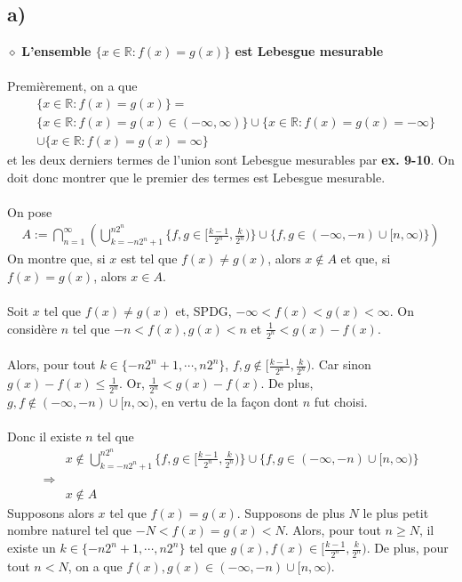 \documentclass[a4paper,10pt]{article}
\begin{document}
\subsection*{a)}
$\diamond$ \textbf{L'ensemble $\{x \in \mathbb{R} : f(x) = g(x) \}$ est Lebesgue mesurable}
\\
\\
Premièrement, on a que 
\begin{align*}
	& \{x \in \mathbb{R} : f(x) = g(x)\} 
	= \\
	& \{x \in \mathbb{R} : f(x) = g(x) \in (-\infty, \infty)\} \cup \{x \in \mathbb{R} : f(x) = g(x) = -\infty \} \\
	& \cup \{x \in \mathbb{R} : f(x) = g(x) = \infty \}
\end{align*}
et les deux derniers termes de l'union sont Lebesgue mesurables par \textbf{ex. 9-10}. On doit donc montrer que le premier des termes est Lebesgue mesurable. 
\\
\\
On pose 
\begin{align*}
	A := \bigcap_{n=1}^\infty \left ( \bigcup_{k = -n2^n + 1}^{n2^n} \{f,g \in [\frac{k-1}{2^n}, \frac{k}{2^n}) \} \cup \{f,g \in (-\infty, -n) \cup [n, \infty)\} \right)
\end{align*}
On montre que, si $x$ est tel que $f(x) \not = g(x)$, alors $x \not \in A$ et que, si $f(x) = g(x)$, alors $x \in A$. 
\\
\\
Soit $x$ tel que $f(x) \not = g(x)$ et, SPDG, $-\infty < f(x) < g(x) < \infty$. On considère $n$ tel que $-n < f(x), g(x) < n$ et $\frac{1}{2^n} < g(x) - f(x)$.
\\
\\
Alors, pour tout $k \in \{-n2^n + 1, \cdots, n2^n\}$, $f,g \not \in [\frac{k-1}{2^n}, \frac{k}{2^n})$. Car sinon $g(x) - f(x) \leq \frac{1}{2^n}$. Or, $\frac{1}{2^n} < g(x) - f(x)$. De plus, $g,f \not \in (-\infty, -n) \cup [n, \infty)$, en vertu de la façon dont $n$ fut choisi. 
\\
\\
Donc il existe $n$ tel que
\begin{align*}
	& x \not \in \bigcup_{k = -n2^n + 1}^{n2^n} \{f,g \in [\frac{k-1}{2^n}, \frac{k}{2^n}) \} \cup \{f,g \in (-\infty, -n) \cup [n, \infty)\} \\
	\Rightarrow \\
	& x \not \in A
\end{align*}
Supposons alors $x$ tel que $f(x) = g(x)$. Supposons de plus $N$ le plus petit nombre naturel tel que $-N < f(x) = g(x) < N$. Alors, pour tout $n \geq N$, il existe un $k \in \{-n2^n + 1, \cdots , n2^n\}$ tel que $g(x),f(x) \in [\frac{k-1}{2^n}, \frac{k}{2^n})$. De plus, pour tout $n < N$, on a que $f(x), g(x) \in (-\infty, -n) \cup [n, \infty)$. 
\end{document}
